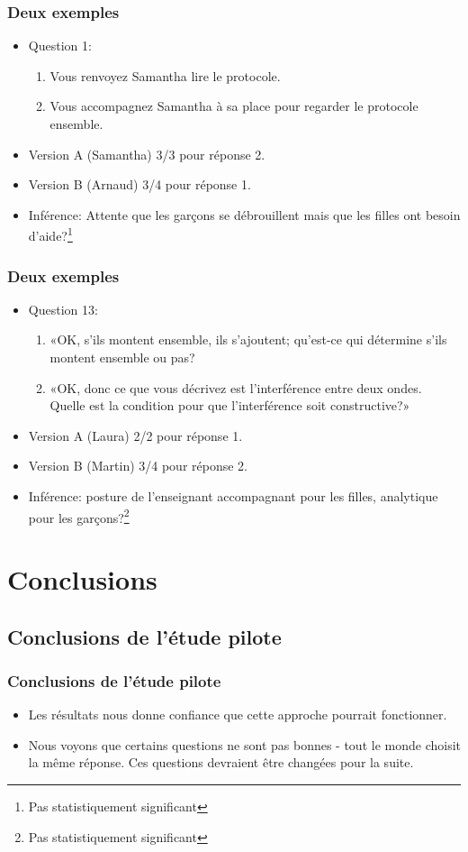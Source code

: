 \documentclass{beamer}
\begin{document}
\begin{frame}
  \frametitle{Deux exemples}
  \begin{itemize}
  \item Question 1:
    \begin{enumerate}
    \item Vous renvoyez Samantha lire le protocole. 
    \item Vous accompagnez Samantha à sa place pour regarder le protocole ensemble. 
    \end{enumerate}
  \item Version A (Samantha) 3/3 pour réponse 2.
  \item Version B (Arnaud) 3/4 pour réponse 1.
  \item Inférence: Attente que les garçons se débrouillent mais que les filles ont
    besoin d'aide?\footnote{Pas statistiquement significant} 
  \end{itemize}
\end{frame}

\begin{frame}
  \frametitle{Deux exemples}
  \begin{itemize}
  \item Question 13:
    \begin{enumerate}
    \item «OK, s’ils montent ensemble, ils s’ajoutent; qu’est-ce qui détermine
      s’ils montent ensemble ou pas?
    \item «OK, donc ce que vous décrivez est l’interférence entre deux ondes.
      Quelle est la condition pour que l’interférence soit constructive?»   
      \end{enumerate}
  \item Version A (Laura) 2/2 pour réponse 1.
  \item Version B (Martin) 3/4 pour réponse 2.
  \item Inférence: posture de l'enseignant accompagnant pour les filles,
    analytique pour les garçons?\footnote{Pas statistiquement significant} 
  \end{itemize}
\end{frame}


\section{Conclusions}
\subsection{Conclusions de l'étude pilote}
\begin{frame}
\frametitle{Conclusions de l'étude pilote}
  \begin{itemize}
  \item Les résultats nous donne confiance que cette approche pourrait fonctionner.
  \item Nous voyons que certains questions ne sont pas bonnes - tout le monde
    choisit la même réponse. Ces questions devraient être changées pour la suite.
  \end{itemize}
\end{frame}
\end{document}
